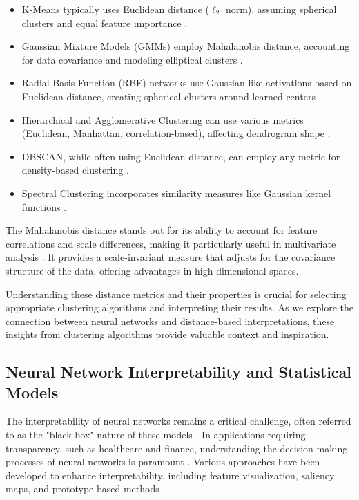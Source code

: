 \begin{itemize}
    \item K-Means typically uses Euclidean distance ($\ell_2$ norm), assuming spherical clusters and equal feature importance \citep{macqueen1967some}.
    
    \item Gaussian Mixture Models (GMMs) employ Mahalanobis distance, accounting for data covariance and modeling elliptical clusters \citep{reynolds2009gaussian}.

    \item Radial Basis Function (RBF) networks use Gaussian-like activations based on Euclidean distance, creating spherical clusters around learned centers \citep{broomhead1988radial}.

    \item Hierarchical and Agglomerative Clustering can use various metrics (Euclidean, Manhattan, correlation-based), affecting dendrogram shape \citep{murtagh1983survey}.
    
    \item DBSCAN, while often using Euclidean distance, can employ any metric for density-based clustering \citep{ester1996density}.
    
    \item Spectral Clustering incorporates similarity measures like Gaussian kernel functions \citep{von2007tutorial}.
\end{itemize}

The Mahalanobis distance stands out for its ability to account for feature correlations and scale differences, making it particularly useful in multivariate analysis \citep{mahalanobis1936generalized, demaesschalck2000mahalanobis}. It provides a scale-invariant measure that adjusts for the covariance structure of the data, offering advantages in high-dimensional spaces.

Understanding these distance metrics and their properties is crucial for selecting appropriate clustering algorithms and interpreting their results. As we explore the connection between neural networks and distance-based interpretations, these insights from clustering algorithms provide valuable context and inspiration.

\subsection{Neural Network Interpretability and Statistical Models}

The interpretability of neural networks remains a critical challenge, often referred to as the "black-box" nature of these models \citep{lipton2016mythos}. In applications requiring transparency, such as healthcare and finance, understanding the decision-making processes of neural networks is paramount \citep{rudin2019stop}. Various approaches have been developed to enhance interpretability, including feature visualization, saliency maps, and prototype-based methods \citep{erhan2009visualizing, simonyan2013deep, kim2016interpreting}.

